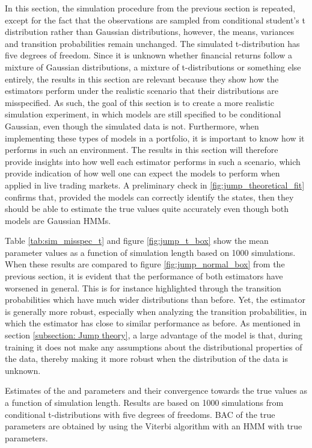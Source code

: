 In this section, the simulation procedure from the previous section is repeated, except for the fact that the observations are sampled from conditional student's t distribution rather than Gaussian distributions, however, the means, variances and transition probabilities remain unchanged. The simulated t-distribution has five degrees of freedom. Since it is unknown whether financial returns follow a mixture of Gaussian distributions, a mixture of t-distributions or something else entirely, the results in this section are relevant because they show how the estimators perform under the realistic scenario that their distributions are misspecified. As such, the goal of this section is to create a more realistic simulation experiment, in which models are still specified to be conditional Gaussian, even though the simulated data is not. Furthermore, when implementing these types of models in a portfolio, it is important to know how it performs in such an environment. The results in this section will therefore provide insights into how well each estimator performs in such a scenario, which provide indication of how well one can expect the models to perform when applied in live trading markets. A preliminary check in \cref{fig:jump_theoretical_fit} confirms that, provided the models can correctly identify the states, then they should be able to estimate the true values quite accurately even though both models are Gaussian HMMs.

Table \ref{tab:sim_misspec_t} and figure \ref{fig:jump_t_box} show the mean parameter values as a function of simulation length based on 1000 simulations. When these results are compared to figure \ref{fig:jump_normal_box} from the previous section, it is evident that the performance of both estimators have worsened in general. This is for instance highlighted through the transition probabilities which have much wider distributions than before. Yet, the \jump estimator is generally more robust, especially when analyzing the transition probabilities, in which the \jump estimator has close to similar performance as before. As mentioned in section \ref{subsection: Jump theory}, a large advantage of the \jump model is that, during training it does not make any assumptions about the distributional properties of the data, thereby making it more robust when the distribution of the data is unknown.

\begin{table}[H]
\centering

\caption[Estimates from conditional t-distributions of the \mle and \jump parameters and their convergence towards the true values]{Estimates of the \mle and \jump parameters and their convergence towards the true values as a function of simulation length. Results are based on 1000 simulations from conditional t-distributions with five degrees of freedoms.  BAC of the true parameters are obtained by using the Viterbi algorithm with an HMM with true parameters.}

\label{tab:sim_misspec_t}
\end{table}

